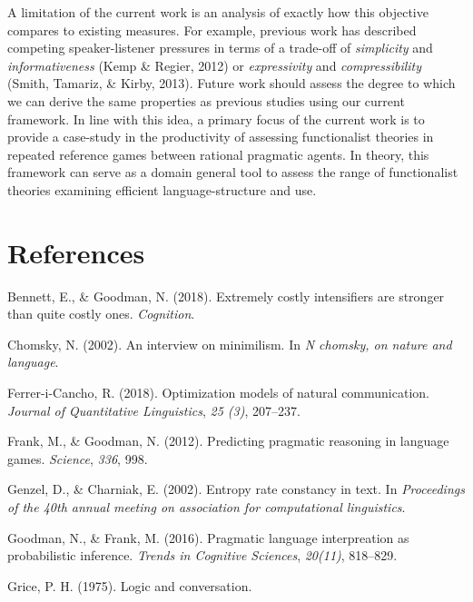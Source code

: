 \documentclass[10pt, letterpaper]{article}
\begin{document}
A limitation of the current work is an analysis of exactly how this
objective compares to existing measures. For example, previous work has
described competing speaker-listener pressures in terms of a trade-off
of \textit{simplicity} and \textit{informativeness} (Kemp \& Regier,
2012) or \textit{expressivity} and \textit{compressibility} (Smith,
Tamariz, \& Kirby, 2013). Future work should assess the degree to which
we can derive the same properties as previous studies using our current
framework. In line with this idea, a primary focus of the current work
is to provide a case-study in the productivity of assessing
functionalist theories in repeated reference games between rational
pragmatic agents. In theory, this framework can serve as a domain
general tool to assess the range of functionalist theories examining
efficient language-structure and use.\par

\section{References}\label{references}

\setlength{\parindent}{-0.1in} \setlength{\leftskip}{0.125in} \noindent

\hypertarget{refs}{}
\hypertarget{ref-BennettGoodman2015a}{}
Bennett, E., \& Goodman, N. (2018). Extremely costly intensifiers are
stronger than quite costly ones. \emph{Cognition}.

\hypertarget{ref-Chomsky2002a}{}
Chomsky, N. (2002). An interview on minimilism. In \emph{N chomsky, on
nature and language}.

\hypertarget{ref-FerreriCancho2018a}{}
Ferrer-i-Cancho, R. (2018). Optimization models of natural
communication. \emph{Journal of Quantitative Linguistics}, \emph{25
(3)}, 207--237.

\hypertarget{ref-FrankGoodman2012a}{}
Frank, M., \& Goodman, N. (2012). Predicting pragmatic reasoning in
language games. \emph{Science}, \emph{336}, 998.

\hypertarget{ref-GenzelCharniak2002a}{}
Genzel, D., \& Charniak, E. (2002). Entropy rate constancy in text. In
\emph{Proceedings of the 40th annual meeting on association for
computational linguistics}.

\hypertarget{ref-GoodmanFrank2016a}{}
Goodman, N., \& Frank, M. (2016). Pragmatic language interpreation as
probabilistic inference. \emph{Trends in Cognitive Sciences},
\emph{20(11)}, 818--829.

\hypertarget{ref-Grice1975a}{}
Grice, P. H. (1975). Logic and conversation.
\end{document}
